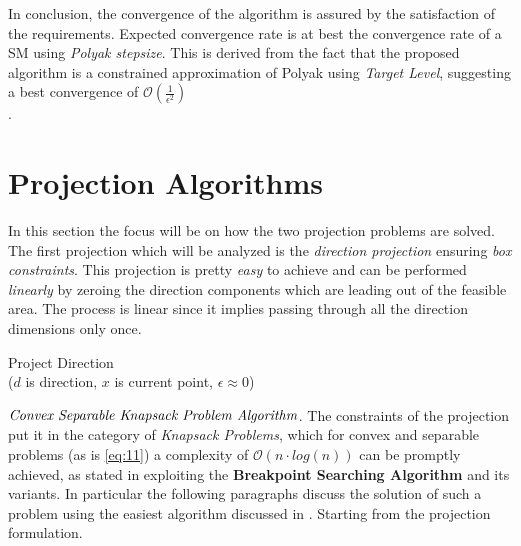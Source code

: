 \documentclass[12pt]{article}
\begin{document}
	In conclusion, the convergence of the algorithm is assured by the satisfaction of the requirements. Expected convergence rate is at best the convergence rate of a SM using \textit{Polyak stepsize}. This is derived from the fact that the proposed algorithm is a constrained approximation of Polyak using \textit{Target Level}, suggesting a best convergence of $\mathcal{O}(\frac{1}{\epsilon^2})$\\\parencite[as stated for \textit{Polyak stepsize: efficiency} in][Slide 41, "\textit{Good (bad) news: $\mathcal{O}(\frac{1}{\epsilon^2})$ optimal for nondifferentiable f}"]{slidesubgr}.

	\section{Projection Algorithms} \label{projections}
	In this section the focus will be on how the two projection problems are solved. \\
	\label{deflectproj}
	The first projection which will be analyzed is the \textit{direction projection} ensuring \textit{box constraints}. This projection is pretty \textit{easy} to achieve and can be performed \textit{linearly} by zeroing the direction components which are leading out of the feasible area. The process is linear since it implies passing through all the direction dimensions only once.\\
    \newline
    \begin{algorithm}[H]\label{algo:2}
	\DontPrintSemicolon
	\small
	\SetAlgoNoEnd
	 \caption{Project Direction \\($d$ is direction, $x$ is current point,  $\epsilon \approx 0$)}
	\end{algorithm}
	\vspace{0.5cm}
    \label{kpproj}$\emph{Convex Separable Knapsack Problem Algorithm}$. The constraints of the projection put it in the category of \textit{Knapsack Problems}, which for convex and separable problems (as is \eqref{eq:11}) a complexity of $\mathcal{O}(n\cdot log(n))$ can be promptly achieved, as stated in \parencite{cqknsp} exploiting the \textbf{Breakpoint Searching Algorithm} and its variants. In particular the following paragraphs discuss the solution of such a problem using the easiest algorithm discussed in \parencite{Kiwiel2008}. Starting from the projection formulation.
    
\end{document}
